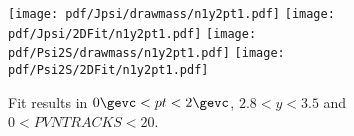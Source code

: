 \begin{figure}[H]
\begin{center}
\texttt{[image: pdf/Jpsi/drawmass/n1y2pt1.pdf]}
\texttt{[image: pdf/Jpsi/2DFit/n1y2pt1.pdf]}
\vspace*{-0.5cm}
\texttt{[image: pdf/Psi2S/drawmass/n1y2pt1.pdf]}
\texttt{[image: pdf/Psi2S/2DFit/n1y2pt1.pdf]}
\vspace*{-0.5cm}
\end{center}
\caption{Fit results in $0\gevc<pt<2\gevc$, $2.8<y<3.5$ and $0<PVNTRACKS<20$.}
\label{Fitn1y2pt1}
\end{figure}
